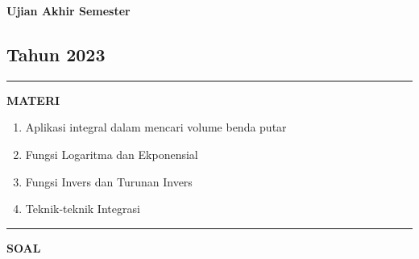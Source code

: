 \newpage
\begin{flushright}
    \textbf{\Large{Ujian Akhir Semester}}
    \subsection*{Tahun 2023}
\end{flushright}
\vspace{0.5cm}
\hrule height 2pt
\vspace{0.5cm}
\begin{center}
    \textbf{\large{MATERI}}
    \begin{enumerate}[leftmargin=*, label={\arabic*}.]
        \item Aplikasi integral dalam mencari volume benda putar
        \item Fungsi Logaritma dan Ekponensial
        \item Fungsi Invers dan Turunan Invers
        \item Teknik-teknik Integrasi
    \end{enumerate}
\end{center}
\vspace{0.2cm}
\hrule height 1pt
\vspace{0.5cm}
\begin{center}
    \textbf{\large{SOAL}}
\end{center}
